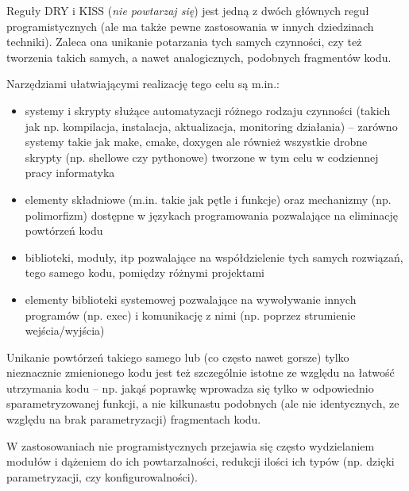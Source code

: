 \begin{ProTip}[breakable]{Reguły DRY i KISS}
 (\textit{nie powtarzaj się}) jest jedną z dwóch głównych reguł programistycznych (ale ma także pewne zastosowania w innych dziedzinach techniki).
Zaleca ona unikanie potarzania tych samych czynności, czy też tworzenia takich samych, a nawet analogicznych, podobnych fragmentów kodu.

Narzędziami ułatwiającymi realizację tego celu są m.in.:
\begin{itemize}
\item systemy i skrypty służące automatyzacji różnego rodzaju czynności (takich jak np. kompilacja, instalacja, aktualizacja, monitoring działania) –
      zarówno systemy takie jak make, cmake, doxygen ale również wszystkie drobne skrypty (np. shellowe czy pythonowe) tworzone w tym celu w codziennej pracy informatyka
\item elementy składniowe (m.in. takie jak pętle i funkcje) oraz mechanizmy (np. polimorfizm) dostępne w językach programowania pozwalające na eliminację powtórzeń kodu
\item biblioteki, moduły, itp pozwalające na współdzielenie tych samych rozwiązań, tego samego kodu, pomiędzy różnymi projektami
\item elementy biblioteki systemowej pozwalające na wywoływanie innych programów (np. exec) i komunikację z nimi (np. poprzez strumienie wejścia/wyjścia)
\end{itemize}

Unikanie powtórzeń takiego samego lub (co często nawet gorsze) tylko nieznacznie zmienionego kodu jest też szczególnie istotne ze względu na łatwość utrzymania kodu
– np. jakąś poprawkę wprowadza się tylko w odpowiednio sparametryzowanej funkcji, a nie kilkunastu podobnych (ale nie identycznych, ze względu na brak parametryzacji) fragmentach kodu.

W zastosowaniach nie programistycznych przejawia się często wydzielaniem modułów i dążeniem do ich powtarzalności, redukcji ilości ich typów (np. dzięki parametryzacji, czy konfigurowalności).

\vspace{7pt}


\end{ProTip}
